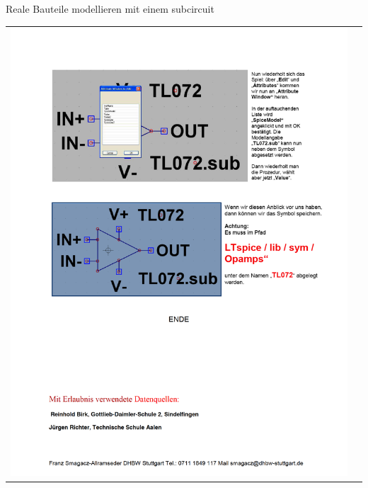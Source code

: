 \begin{frame}[t]{Reale Bauteile modellieren mit einem subcircuit} 
    
    \begin{spacing}{0.9} \begin{tiny}
      \begin{table}[h!]
        \begin{tabular}{p{5cm} p{5cm}}
            \begin{minipage}{0.5\textwidth}                
                \includegraphics[width=\linewidth]{pictures/legacy/tl072_5.png}
            \end{minipage} 
            &
            \begin{minipage}{0.5\textwidth}
 
            \end{minipage} 
      \end{tabular}
    \end{table}
    \end{tiny} \end{spacing}
\end{frame}

